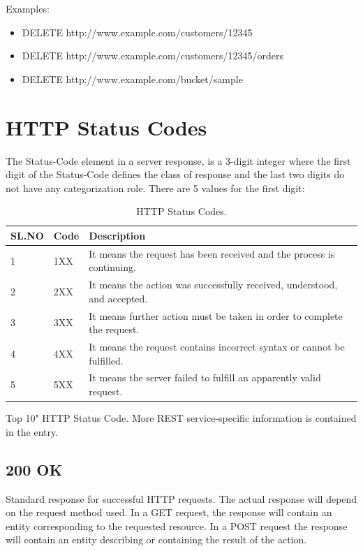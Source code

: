 \documentclass{report}
\begin{document}
	Examples:
	\begin{itemize}
		\item DELETE http://www.example.com/customers/12345
		\item DELETE http://www.example.com/customers/12345/orders
		\item DELETE http://www.example.com/bucket/sample
	\end{itemize}
	\section{HTTP Status Codes}
	The Status-Code element in a server response, is a 3-digit integer where the first digit of the Status-Code defines the class of response and the last two digits do not have any categorization role. There are 5 values for the first digit:
	\begin{table}[h]
		\begin{center}
			\caption{HTTP Status Codes.}
			\label{tab:}
			\begin{tabular}{|p{1cm}|p{1cm}|p{10cm}|} %
				\hline
				\textbf{SL.NO} & \textbf{Code} & \textbf{Description}\\
				\hline
				1&1XX& It means the request has been received and the process is continuing.\\
				\hline
				2&2XX& It means the action was successfully received, understood, and accepted.\\
				\hline
				3&3XX& It means further action must be taken in order to complete the request.\\
				\hline
				4&4XX& It means the request contains incorrect syntax or cannot be fulfilled.\\
				\hline
				5&5XX& It means the server failed to fulfill an apparently valid request.\\
				\hline
			\end{tabular}
		\end{center}
	\end{table}
	\par Top 10" HTTP Status Code. More REST service-specific information is contained in the entry.
	\subsection{200 OK}
	\par Standard response for successful HTTP requests. The actual response will depend on the request method used. In a GET request, the response will contain an entity corresponding to the requested resource. In a POST request the response will contain an entity describing or containing the result of the action.
\end{document}
